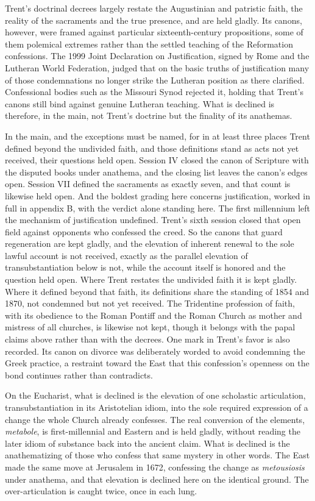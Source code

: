 \documentclass[11pt,twoside]{article}
\newcommand{\unit}[1]{\needspace{3\baselineskip}\par\medskip{\normalfont\bfseries\color{subhead}#1}\par\nobreak\smallskip}
\begin{document}
\unit{Trent (1545 to 1563).}
Trent's doctrinal decrees largely restate the Augustinian and patristic faith, the reality of the sacraments and the true presence, and are held gladly. Its canons, however, were framed against particular sixteenth-century propositions, some of them polemical extremes rather than the settled teaching of the Reformation confessions. The 1999 Joint Declaration on Justification, signed by Rome and the Lutheran World Federation, judged that on the basic truths of justification many of those condemnations no longer strike the Lutheran position as there clarified. Confessional bodies such as the Missouri Synod rejected it, holding that Trent's canons still bind against genuine Lutheran teaching. What is declined is therefore, in the main, not Trent's doctrine but the finality of its anathemas.

In the main, and the exceptions must be named, for in at least three places Trent defined beyond the undivided faith, and those definitions stand as acts not yet received, their questions held open. Session IV closed the canon of Scripture with the disputed books under anathema, and the closing list leaves the canon's edges open. Session VII defined the sacraments as exactly seven, and that count is likewise held open. And the boldest grading here concerns justification, worked in full in appendix B, with the verdict alone standing here. The first millennium left the mechanism of justification undefined. Trent's sixth session closed that open field against opponents who confessed the creed. So the canons that guard regeneration are kept gladly, and the elevation of inherent renewal to the sole lawful account is not received, exactly as the parallel elevation of transubstantiation below is not, while the account itself is honored and the question held open. Where Trent restates the undivided faith it is kept gladly. Where it defined beyond that faith, its definitions share the standing of 1854 and 1870, not condemned but not yet received. The Tridentine profession of faith, with its obedience to the Roman Pontiff and the Roman Church as mother and mistress of all churches, is likewise not kept, though it belongs with the papal claims above rather than with the decrees. One mark in Trent's favor is also recorded. Its canon on divorce was deliberately worded to avoid condemning the Greek practice, a restraint toward the East that this confession's openness on the bond continues rather than contradicts.

\unit{The Eucharist, caught in both lungs.}
On the Eucharist, what is declined is the elevation of one scholastic articulation, transubstantiation in its Aristotelian idiom, into the sole required expression of a change the whole Church already confesses. The real conversion of the elements, \emph{metabole}, is first-millennial and Eastern and is held gladly, without reading the later idiom of substance back into the ancient claim. What is declined is the anathematizing of those who confess that same mystery in other words. The East made the same move at Jerusalem in 1672, confessing the change as \emph{metousiosis} under anathema, and that elevation is declined here on the identical ground. The over-articulation is caught twice, once in each lung.
\end{document}
